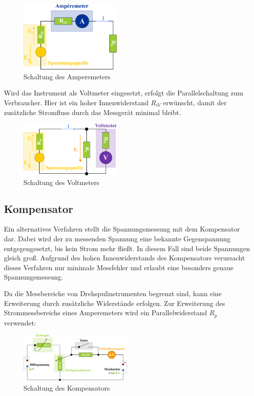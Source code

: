 \begin{figure}[!ht]
    \centering
    \includegraphics[width=0.45\textwidth]{img/23/AmperemeterSK.pdf}
    \caption{Schaltung des Amperemeters \cite{skript25}}
    \label{fig:amperemeter}
\end{figure}

Wird das Instrument als Voltmeter eingesetzt, erfolgt die Parallelschaltung zum Verbraucher. Hier ist ein hoher Innenwiderstand $R_{iV}$ erwünscht, damit der zusätzliche Stromfluss durch das Messgerät minimal bleibt.

\begin{figure}[!ht]
    \centering
    \includegraphics[width=0.45\textwidth]{img/23/VoltmeterSK.pdf}
    \caption{Schaltung des Voltmeters \cite{skript25}}
    \label{fig:voltmeter}
\end{figure}

\subsection*{Kompensator}
Ein alternatives Verfahren stellt die Spannungsmessung mit dem Kompensator dar. Dabei wird der zu messenden Spannung eine bekannte Gegenspannung entgegengesetzt, bis kein Strom mehr fließt. In diesem Fall sind beide Spannungen gleich groß. Aufgrund des hohen Innenwiderstands des Kompensators verursacht dieses Verfahren nur minimale Messfehler und erlaubt eine besonders genaue Spannungsmessung.

Da die Messbereiche von Drehspulinstrumenten begrenzt sind, kann eine Erweiterung durch zusätzliche Widerstände erfolgen. Zur Erweiterung des Strommessbereichs eines Amperemeters wird ein Parallelwiderstand $R_p$ verwendet:

\begin{figure}[!ht]
    \centering
    \includegraphics[width=0.5\textwidth]{img/23/kompensaterSK.pdf}
    \caption{Schaltung des Kompensators \cite{skript25}}
    \label{fig:kompensator}
\end{figure}

